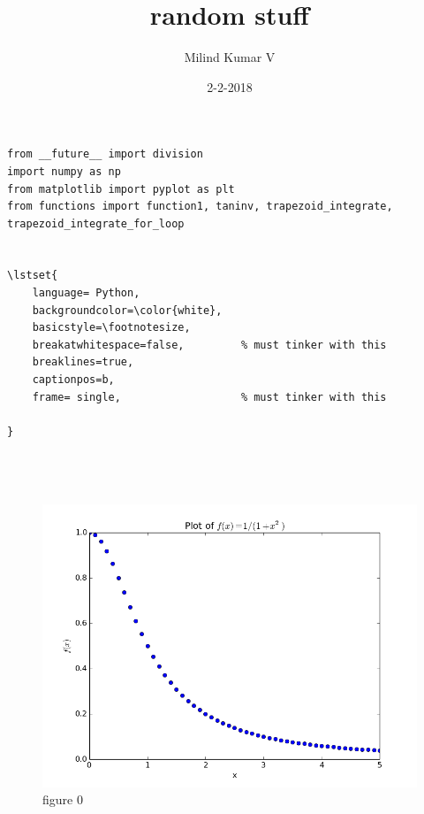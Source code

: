 \documentclass{article}
\title{random stuff}
\date{2-2-2018}
\author{Milind Kumar V}
\begin{document}
\lstset{language=Python}
\lstset{frame=lines}
\lstset{basicstyle=\footnotesize}
\begin{lstlisting}
from __future__ import division
import numpy as np
from matplotlib import pyplot as plt
from functions import function1, taninv, trapezoid_integrate, 
trapezoid_integrate_for_loop


\lstset{
	language= Python,
	backgroundcolor=\color{white},
	basicstyle=\footnotesize,
	breakatwhitespace=false,         % must tinker with this
    breaklines=true,
    captionpos=b,
    frame= single,					 % must tinker with this

}




\end{lstlisting}


\begin{figure}[h!]
	\includegraphics[width=\linewidth]{figure0.png}
	\caption{figure 0}
\end{figure}	
	
\end{document}
